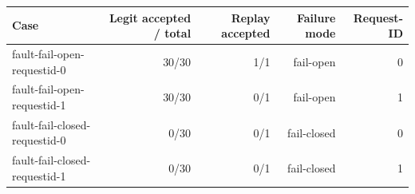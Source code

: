 \begin{tabular}{lrrrr}\toprule
Case & Legit accepted / total & Replay accepted & Failure mode & Request-ID \\
\midrule
fault-fail-open-requestid-0 & 30/30 & 1/1 & fail-open & 0 \\
fault-fail-open-requestid-1 & 30/30 & 0/1 & fail-open & 1 \\
fault-fail-closed-requestid-0 & 0/30 & 0/1 & fail-closed & 0 \\
fault-fail-closed-requestid-1 & 0/30 & 0/1 & fail-closed & 1 \\
\bottomrule\end{tabular}
